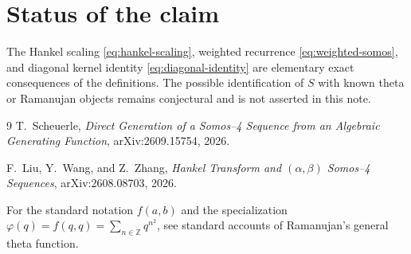 \documentclass[11pt]{article}
\begin{document}
\section{Status of the claim}
The Hankel scaling \eqref{eq:hankel-scaling}, weighted recurrence \eqref{eq:weighted-somos}, and diagonal kernel identity \eqref{eq:diagonal-identity} are elementary exact consequences of the definitions. The possible identification of $S$ with known theta or Ramanujan objects remains conjectural and is not asserted in this note.

\begin{thebibliography}{9}
T.~Scheuerle,
\emph{Direct Generation of a Somos--4 Sequence from an Algebraic Generating Function},
arXiv:2609.15754, 2026.

F.~Liu, Y.~Wang, and Z.~Zhang,
\emph{Hankel Transform and $(\alpha,\beta)$ Somos--4 Sequences},
arXiv:2608.08703, 2026.

For the standard notation $f(a,b)$ and the specialization
$\varphi(q)=f(q,q)=\sum_{n\in\mathbb Z}q^{n^2}$, see standard accounts of Ramanujan's general theta function.
\end{thebibliography}
\end{document}
